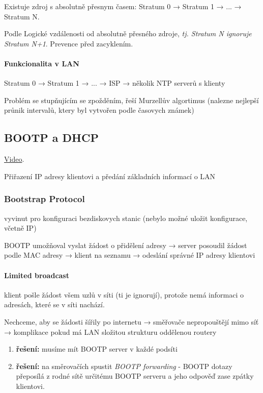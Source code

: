 \documentclass[10pt,a4paper]{article}
\begin{document}
Existuje zdroj s absolutně přesnym časem: Stratum 0 → Stratum 1 → ... → Stratum N. 

Podle Logické vzdálenosti od absolutně přesného zdroje, \textit{tj. Stratum N ignoruje Stratum N+1}. Prevence před zacyklením.

\paragraph{Funkcionalita v LAN} Stratum 0 → Stratum 1 → ... → ISP → několik NTP serverů s klienty

Problém se stupňujícím se zpožděním, řeší Murzellův algortimus (nalezne nejlepší průnik intervalů, ktery byl vytvořen podle časovych známek)

\subsection{BOOTP a DHCP}

\href{https://youtu.be/e6-TaH5bkjo}{Video}.

Přiřazení IP adresy klientovi a předání základních informací o LAN

\subsubsection{Bootstrap Protocol} vyvinut pro konfiguraci bezdiskovych stanic (nebylo možné uložit konfigurace, včetně IP)

BOOTP umožňoval vyslat žádost o přidělení adresy → server posoudil žádost podle MAC adresy → klient na seznamu → odeslání správné IP adresy klientovi

\paragraph{Limited broadcast} klient pošle žádost všem uzlů v síti (ti je ignorují), protože nemá informaci o adresách, které se v síti nachází.

Nechceme, aby se žádosti šířily po internetu → směřovače nepropouštějí mimo síť → komplikace pokud má LAN složitou strukturu oddělenou routery

\begin{enumerate}
    \item \textbf{řešení:} musíme mít BOOTP server v každé podsíti
    \item \textbf{řešení:} na směrovačích spustit \textit{BOOTP forwarding} - BOOTP dotazy přeposílá z rodné sítě určitému BOOTP serveru a jeho odpověď zase zpátky klientovi.
\end{enumerate}
\end{document}

